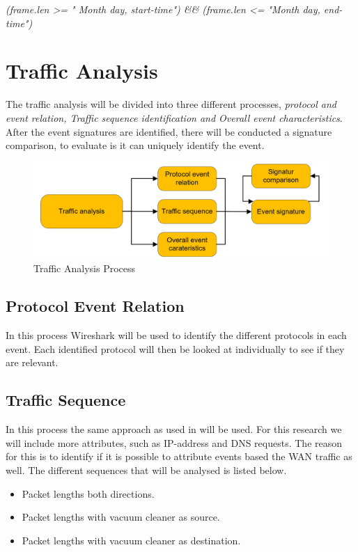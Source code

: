 \textit{(frame.len >= " Month day, start-time") \&\& (frame.len <= "Month day, end-time")}


\section{Traffic Analysis}
The traffic analysis will be divided into three different processes, \textit{protocol and event relation, Traffic sequence identification and Overall event characteristics}. After the event signatures are identified, there will be conducted a signature comparison, to evaluate is it can uniquely identify the event.

\begin{figure}[H]
    \centering
    \includegraphics[width=\textwidth]{figures/TrafficAnalysisProcess.png}
    \caption{Traffic Analysis Process}
    \label{fig:TrafficAnalysisProcess}
\end{figure}

\subsection{Protocol Event Relation}
In this process Wireshark will be used to identify the different protocols in each event. Each identified protocol will then be looked at individually to see if they are relevant. 

\subsection{Traffic Sequence}
In this process the same approach as used in \cite{pingpong} will be used. For this research we will include more attributes, such as IP-address and DNS requests. The reason for this is to identify if it is possible to attribute events based the WAN traffic as well. The different sequences that will be analysed is listed below.  
\begin{itemize}
    \item Packet lengths both directions.
    \item Packet lengths with vacuum cleaner as source.
    \item Packet lengths with vacuum cleaner as destination.
\end{itemize}

